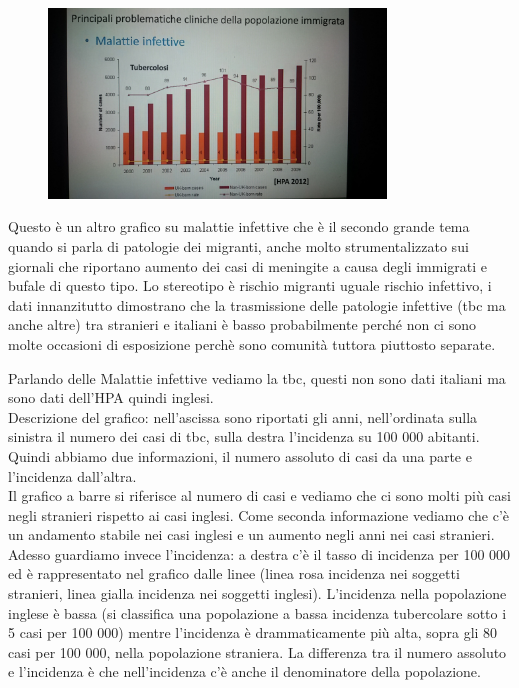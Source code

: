 \begin{figure}[!ht]
\centering
	\includegraphics[width=0.8\textwidth]{27/image4.jpeg}
	\end{figure}
	
Questo è un altro grafico su malattie infettive che è il secondo grande
tema quando si parla di patologie dei migranti, anche molto
strumentalizzato sui giornali che riportano aumento dei casi di
meningite a causa degli immigrati e bufale di questo tipo. Lo stereotipo
è rischio migranti uguale rischio infettivo, i dati innanzitutto
dimostrano che la trasmissione delle patologie infettive (tbc ma anche
altre) tra stranieri e italiani è basso probabilmente perché non ci sono
molte occasioni di esposizione perchè sono comunità tuttora piuttosto
separate.

Parlando delle Malattie infettive vediamo la tbc, questi non sono dati
italiani ma sono dati dell'HPA quindi inglesi.\\
Descrizione del grafico: nell'ascissa sono riportati gli anni,
nell'ordinata sulla sinistra il numero dei casi di tbc, sulla destra
l'incidenza su 100 000 abitanti. Quindi abbiamo due informazioni, il
numero assoluto di casi da una parte e l'incidenza dall'altra.\\
Il grafico a barre si riferisce al numero di casi e vediamo che ci sono
molti più casi negli stranieri rispetto ai casi inglesi. Come seconda
informazione vediamo che c'è un andamento stabile nei casi inglesi e un
aumento negli anni nei casi stranieri. Adesso guardiamo invece
l'incidenza: a destra c'è il tasso di incidenza per 100 000 ed è
rappresentato nel grafico dalle linee (linea rosa incidenza nei soggetti
stranieri, linea gialla incidenza nei soggetti inglesi). L'incidenza
nella popolazione inglese è bassa (si classifica una popolazione a bassa
incidenza tubercolare sotto i 5 casi per 100 000) mentre l'incidenza è
drammaticamente più alta, sopra gli 80 casi per 100 000, nella
popolazione straniera. La differenza tra il numero assoluto e
l'incidenza è che nell'incidenza c'è anche il denominatore della
popolazione.

